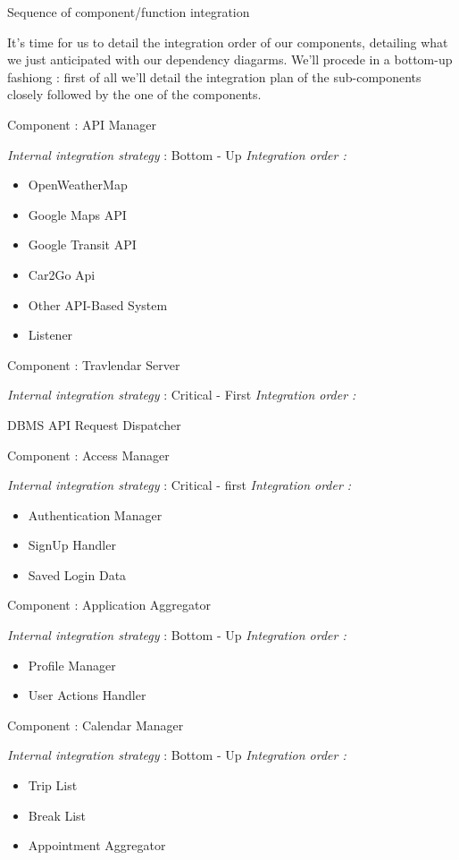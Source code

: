 Sequence of component/function integration

It's time for us to detail the integration order of our components, detailing what we just anticipated with our dependency diagarms.
We'll procede in a bottom-up fashiong : first of all we'll detail the integration plan of the sub-components closely followed by the one of the components.


Component : API Manager

\textit{Internal integration strategy} : Bottom - Up
\textit{Integration order :}
	\begin{itemize}
		\item OpenWeatherMap
		\item Google Maps API
		\item Google Transit API
		\item Car2Go Api
		\item Other API-Based System
		\item Listener
	\end{itemize}


Component : Travlendar Server

\textit{Internal integration strategy} : Critical - First
\textit{Integration order :}
	\begin{itemize}
		\itemize DBMS
		\itemize	 API Request Dispatcher
	\end{itemize}
	

Component : Access Manager

\textit{Internal integration strategy} : Critical - first
\textit{Integration order :}
	\begin{itemize}
		\item Authentication Manager
		\item SignUp Handler
		\item Saved Login Data
	\end{itemize}
		
Component : Application Aggregator

\textit{Internal integration strategy} : Bottom - Up
\textit{Integration order :}
	\begin{itemize}
		\item Profile Manager
		\item User Actions Handler
	\end{itemize}
	
Component : Calendar Manager

\textit{Internal integration strategy} : Bottom - Up
\textit{Integration order :}
	\begin{itemize}
		\item Trip List
		\item Break List
		\item Appointment Aggregator
	\end{itemize}
	
